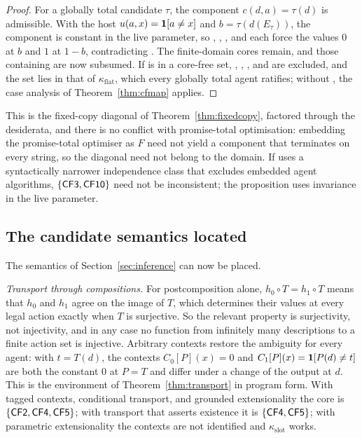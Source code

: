 \begin{proof}
For a globally total candidate $\tau$, the component $c(d,a)=\tau(d)$ is admissible. With the host
$u(a,x)=\mathbf{1}[a\ne x]$ and $b=\tau(d(E_\tau))$, the component is constant in the live parameter, so
, , , and  each force the values $0$ at $b$ and $1$ at $1-b$, contradicting
. The finite-domain cores remain, and those containing  are now subsumed. If  is
in a core-free set, , , , and  are excluded, and the set lies in that of
$\kappa_{\mathrm{flat}}$, which every globally total agent ratifies; without , the case analysis of
Theorem~\ref{thm:cfmap} applies.
\end{proof}

This is the fixed-copy diagonal of Theorem~\ref{thm:fixedcopy}, factored through the desiderata, and
there is no conflict with promise-total optimisation: embedding the promise-total optimiser as $F$
need not yield a component that terminates on every string, so the diagonal need not belong to the
domain. If  uses a syntactically narrower independence class that excludes embedded agent
algorithms, $\{\textup{\textsf{CF3}},\textup{\textsf{CF10}}\}$ need not be inconsistent; the proposition uses invariance in the
live parameter.

\subsection{The candidate semantics located}\label{sec:candidates}

The semantics of Section~\ref{sec:inference} can now be placed.

\emph{Transport through compositions.} For postcomposition alone, $h_0\circ T=h_1\circ T$ means that $h_0$
and $h_1$ agree on the image of $T$, which determines their values at every legal action exactly when
$T$ is surjective. So the relevant property is surjectivity, not injectivity, and in any case no
function from infinitely many descriptions to a finite action set is injective. Arbitrary contexts
restore the ambiguity for every agent: with $t=T(d)$, the contexts $C_0[P](x)=0$ and
$C_1[P](x)=\mathbf{1}[P(d)\ne t]$ are both the constant $0$ at $P=T$ and differ under a change of the output at
$d$. This is the environment of Theorem~\ref{thm:transport} in program form. With tagged contexts,
conditional transport, and grounded extensionality the core is $\{\textup{\textsf{CF2}},\textup{\textsf{CF4}},\textup{\textsf{CF5}}\}$; with
transport that asserts existence it is $\{\textup{\textsf{CF4}},\textup{\textsf{CF5}}\}$; with parametric extensionality the
contexts are not identified and $\kappa_{\mathrm{slot}}$ works.

